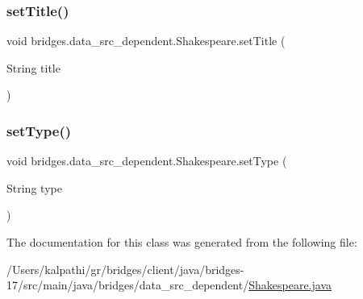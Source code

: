 \mbox{\label{classbridges_1_1data__src__dependent_1_1_shakespeare_a2687017aca35bb26b148f784a0bff732}} 
\subsubsection{\texorpdfstring{set\+Title()}{setTitle()}}
{\footnotesize\ttfamily void bridges.\+data\+\_\+src\+\_\+dependent.\+Shakespeare.\+set\+Title (\begin{DoxyParamCaption}\item[{String}]{title }\end{DoxyParamCaption})}

\mbox{\label{classbridges_1_1data__src__dependent_1_1_shakespeare_afcee18014d5630a0a15701635005bea2}} 
\subsubsection{\texorpdfstring{set\+Type()}{setType()}}
{\footnotesize\ttfamily void bridges.\+data\+\_\+src\+\_\+dependent.\+Shakespeare.\+set\+Type (\begin{DoxyParamCaption}\item[{String}]{type }\end{DoxyParamCaption})}



The documentation for this class was generated from the following file\+:\begin{DoxyCompactItemize}
\item 
/\+Users/kalpathi/gr/bridges/client/java/bridges-\/17/src/main/java/bridges/data\+\_\+src\+\_\+dependent/\mbox{\hyperlink{_shakespeare_8java}{Shakespeare.\+java}}\end{DoxyCompactItemize}
